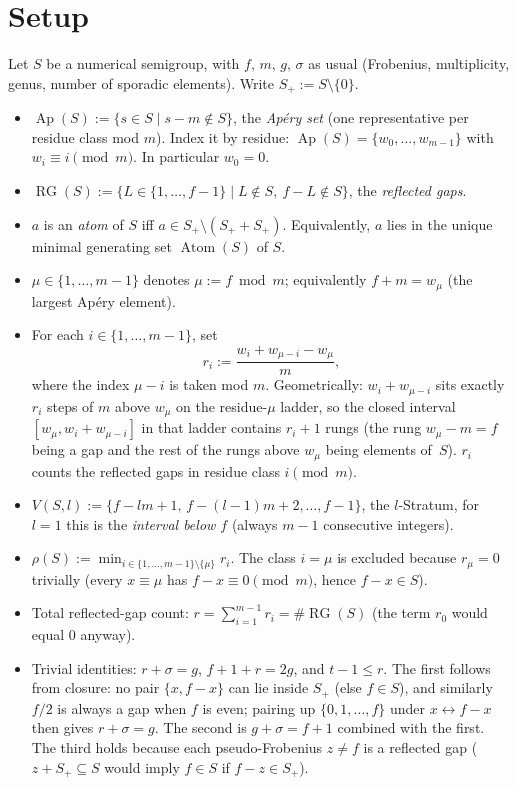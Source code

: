 \documentclass[11pt, a4paper]{article}
\begin{document}
\section{Setup}
Let $S$ be a numerical semigroup, with $f,\,m,\,g,\,\sigma$ as usual
(Frobenius, multiplicity, genus, number of sporadic elements).
Write $S_+ := S \setminus \{0\}$.
\begin{itemize}
    \item $\operatorname{Ap}(S):=\{s\in S \mid s-m \notin S\}$, the
    \emph{Apéry set} (one representative per residue class mod $m$).
    Index it by residue: $\operatorname{Ap}(S) = \{w_0,\dots,w_{m-1}\}$
    with $w_i \equiv i \pmod m$. In particular $w_0 = 0$.
    
    \item $\operatorname{RG}(S) := \{L \in \{1,\dots,f-1\}
    \mid L \notin S,\ f-L \notin S\}$, the \emph{reflected gaps}.
    
    \item $a$ is an \emph{atom} of $S$ iff
    $a \in S_+ \setminus (S_+ + S_+)$. Equivalently, $a$ lies in the
    unique minimal generating set $\operatorname{Atom}(S)$ of $S$.
    \item $\mu \in \{1,\dots,m-1\}$ denotes $\mu := f \bmod m$;
    equivalently $f+m = w_\mu$ (the largest Apéry element).
    \item For each $i \in \{1,\dots,m-1\}$, set
    \[
        r_i := \frac{w_i + w_{\mu-i} - w_\mu}{m},
    \]
    where the index $\mu - i$ is taken mod $m$. Geometrically:
    $w_i + w_{\mu-i}$ sits exactly $r_i$ steps of $m$ above $w_\mu$
    on the residue-$\mu$ ladder, so the closed interval
    $[w_\mu, w_i + w_{\mu-i}]$ in that ladder contains $r_i + 1$ rungs
    (the rung $w_\mu - m = f$ being a gap and the rest of the rungs
    above $w_\mu$ being elements of~$S$). $r_i$ counts the reflected
    gaps in residue class $i \pmod m$.
    
    \item $V(S,l) := \{f-lm+1,\,f-(l-1)m+2,\dots,f-1\}$, the $l$-Stratum, for 
    $l=1$ this is the 
    \emph{interval below $f$} (always $m-1$ consecutive integers).
    \item $\rho(S) := \min_{i \in \{1,\dots,m-1\}\setminus\{\mu\}} r_i$.
    The class $i = \mu$ is excluded because $r_\mu = 0$ trivially
    (every $x \equiv \mu$ has $f - x \equiv 0 \pmod m$, hence
    $f - x \in S$).
    \item Total reflected-gap count:
    $r = \sum_{i=1}^{m-1} r_i = \#\operatorname{RG}(S)$
    (the term $r_0$ would equal $0$ anyway).
    \item Trivial identities: $r + \sigma = g$, $f + 1 + r = 2g$,
    and $t - 1 \le r$. The first follows from closure: no pair
    $\{x, f-x\}$ can lie inside $S_+$ (else $f \in S$), and similarly
    $f/2$ is always a gap when $f$ is even; pairing up
    $\{0,1,\dots,f\}$ under $x \leftrightarrow f-x$ then gives
    $r + \sigma = g$. The second is $g + \sigma = f+1$ combined with
    the first. The third holds because each pseudo-Frobenius
    $z \neq f$ is a reflected gap ($z + S_+ \subseteq S$ would imply
    $f \in S$ if $f - z \in S_+$).
\end{itemize}
\end{document}
